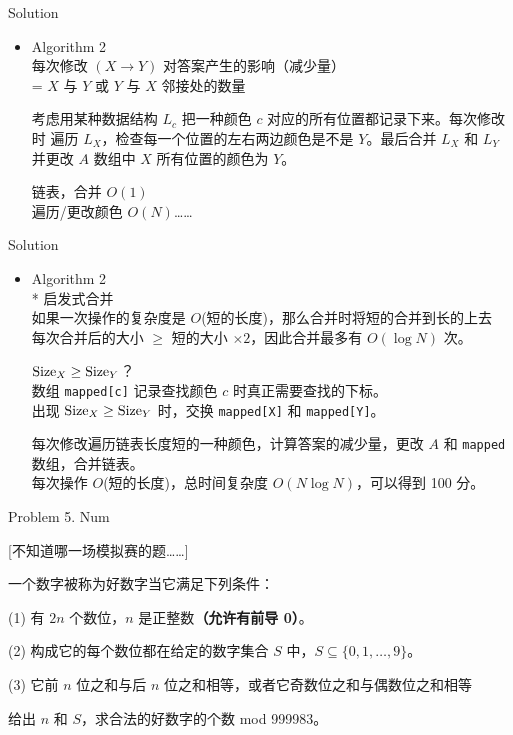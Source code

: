 \documentclass[UTF8]{beamer}
\begin{document}
\begin{frame}{Solution}

\begin{itemize}
    \item Algorithm 2 \\
        每次修改 $(X \rightarrow Y)$ 对答案产生的影响（减少量） \\
        = $X$ 与 $Y$ 或 $Y$ 与 $X$ 邻接处的数量

        \pause
        考虑用某种数据结构 $L_c$ 把一种颜色 $c$ 对应的所有位置都记录下来。每次修改时
        遍历 $L_X$，检查每一个位置的左右两边颜色是不是 $Y$。最后合并 $L_X$ 和 $L_Y$
        并更改 $A$ 数组中 $X$ 所有位置的颜色为 $Y$。

        \pause 链表，合并 $O(1)$ \\
        \pause 遍历/更改颜色 $O(N)$……
        
\end{itemize}

\end{frame}

\begin{frame}{Solution}

\begin{itemize}
    \item Algorithm 2 \\
        * 启发式合并 \\
        如果一次操作的复杂度是 $O$(短的长度)，那么合并时将短的合并到长的上去 \\
        每次合并后的大小 $\geq$ 短的大小 $\times 2$，因此合并最多有 $O(\log N)$ 次。

        \pause
        ${\rm Size}_X \ge {\rm Size}_Y$？ \\
        数组 \texttt{mapped[c]} 记录查找颜色 $c$ 时真正需要查找的下标。 \\
        出现 ${\rm Size}_X \ge {\rm Size}_Y$ 时，交换 \texttt{mapped[X]} 和 \texttt{mapped[Y]}。

        \pause
        每次修改遍历链表长度短的一种颜色，计算答案的减少量，更改 $A$ 和 \texttt{mapped} 数组，合并链表。 \\
        每次操作 $O$(短的长度)，总时间复杂度 $O(N \log N)$，可以得到 100 分。
\end{itemize}

\end{frame}


\begin{frame}{Problem 5. Num}

[不知道哪一场模拟赛的题……]

一个数字被称为好数字当它满足下列条件：

(1) 有 $2n$ 个数位，$n$ 是正整数\textbf{（允许有前导 0）}。

(2) 构成它的每个数位都在给定的数字集合 $S$ 中，$S \subseteq \{0,1,\dots,9\}$。

(3) 它前 $n$ 位之和与后 $n$ 位之和相等，或者它奇数位之和与偶数位之和相等

给出 $n$ 和 $S$，求合法的好数字的个数 mod 999983。

\end{frame}
\end{document}
